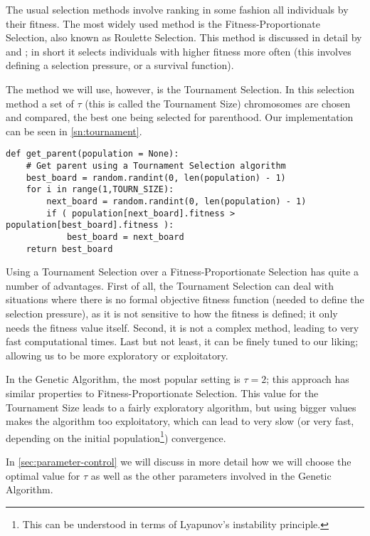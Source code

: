 The usual selection methods involve ranking in some fashion all individuals by their fitness. The most widely used method is the Fitness-Proportionate Selection, also known as Roulette Selection. This method is discussed in detail by \textcite{Sean2010} and \textcite{Gendreau2010}; in short it selects individuals with higher fitness more often (this involves defining a selection pressure, or a survival function).

The method we will use, however, is the Tournament Selection. In this selection method a set of $\tau$ (this is called the Tournament Size) chromosomes are chosen and compared, the best one being selected for parenthood. Our implementation can be seen in \cref{sn:tournament}.

\begin{lstlisting}[label=sn:tournament, caption=Parent selection using a Tournament Selection]
def get_parent(population = None):
	# Get parent using a Tournament Selection algorithm
	best_board = random.randint(0, len(population) - 1)
	for i in range(1,TOURN_SIZE):
		next_board = random.randint(0, len(population) - 1)
		if ( population[next_board].fitness > population[best_board].fitness ):
			best_board = next_board
	return best_board
\end{lstlisting}

Using a Tournament Selection over a Fitness-Proportionate Selection has quite a number of advantages. First of all, the Tournament Selection can deal with situations where there is no formal objective fitness function (needed to define the selection pressure), as it is not sensitive to how the fitness is defined; it only needs the fitness value itself. Second, it is not a complex method, leading to very fast computational times. Last but not least, it can be finely tuned to our liking; allowing us to be more exploratory or exploitatory.

In the Genetic Algorithm, the most popular setting is $\tau = 2$; this approach has similar properties to Fitness-Proportionate Selection. This value for the Tournament Size leads to a fairly exploratory algorithm, but using bigger values makes the algorithm too exploitatory, which can lead to very slow (or very fast, depending on the initial population\footnote{This can be understood in terms of Lyapunov's instability principle.}) convergence.

In \cref{sec:parameter-control} we will discuss in more detail how we will choose the optimal value for $\tau$ as well as the other parameters involved in the Genetic Algorithm.

